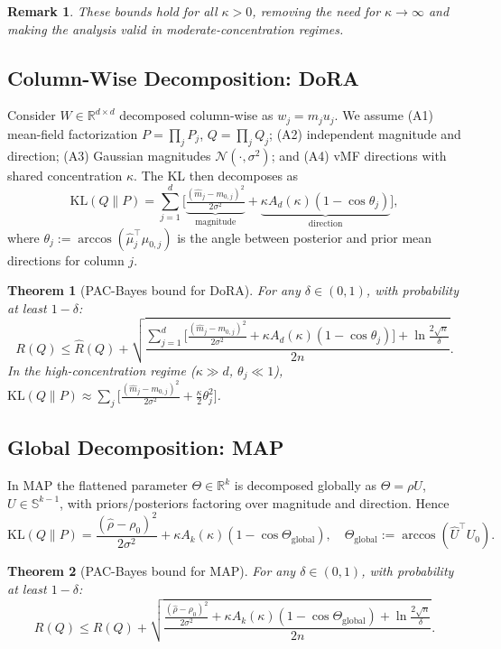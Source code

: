 \documentclass[11pt]{article}
\newtheorem{theorem}{Theorem}
\newtheorem{remark}{Remark}
\newcommand{\KL}{\mathrm{KL}}
\newcommand{\Risk}{R}
\newcommand{\eRisk}{\hat{R}}
\newcommand{\Thetaglob}{\Theta_{\mathrm{global}}}
\newcommand{\R}{\mathbb{R}}
\begin{document}
\begin{remark}
These bounds hold for all $\kappa>0$, removing the need for $\kappa\to\infty$ and
making the analysis valid in moderate-concentration regimes.
\end{remark}

\subsection{Column-Wise Decomposition: DoRA}
Consider $W\in\R^{d\times d}$ decomposed column-wise as $w_j = m_j u_j$. We assume
(A1) mean-field factorization $P=\prod_j P_j$, $Q=\prod_j Q_j$; (A2) independent
magnitude and direction; (A3) Gaussian magnitudes
$\mathcal{N}(\cdot,\sigma^2)$; and (A4) vMF directions with shared concentration
$\kappa$. The KL then decomposes as
\begin{equation}\label{eq:kldecomp}
\KL(Q\|P) = \sum_{j=1}^d \Big[ \underbrace{\tfrac{(\hat m_j-m_{0,j})^2}{2\sigma^2}}_{\text{magnitude}}
+ \underbrace{\kappa A_d(\kappa)(1-\cos\theta_j)}_{\text{direction}} \Big],
\end{equation}
where $\theta_j := \arccos(\hat\mu_j^\top\mu_{0,j})$ is the angle between posterior
and prior mean directions for column $j$.

\begin{theorem}[PAC-Bayes bound for DoRA]\label{thm:dora-bound}
For any $\delta\in(0,1)$, with probability at least $1-\delta$:
\[
\Risk(Q)\le\eRisk(Q)+\sqrt{\frac{\sum_{j=1}^d\!\big[\frac{(\hat m_j-m_{0,j})^2}{2\sigma^2}
+\kappa A_d(\kappa)(1-\cos\theta_j)\big]+\ln\frac{2\sqrt n}{\delta}}{2n}}.
\]
In the high-concentration regime ($\kappa\gg d$, $\theta_j\ll1$),
$\KL(Q\|P)\approx\sum_j\big[\frac{(\hat m_j-m_{0,j})^2}{2\sigma^2}+\frac{\kappa}{2}\theta_j^2\big]$.
\end{theorem}

\subsection{Global Decomposition: MAP}
In MAP the flattened parameter $\Theta\in\R^k$ is decomposed globally as
$\Theta=\rho U$, $U\in\mathbb{S}^{k-1}$, with priors/posteriors factoring over
magnitude and direction. Hence
\begin{equation}
\KL(Q\|P)=\frac{(\hat\rho-\rho_0)^2}{2\sigma^2}+\kappa A_k(\kappa)(1-\cos\Thetaglob),
\quad \Thetaglob:=\arccos(\hat U^\top U_0).
\end{equation}

\begin{theorem}[PAC-Bayes bound for MAP]\label{thm:map-bound}
For any $\delta\in(0,1)$, with probability at least $1-\delta$:
\[
\Risk(Q)\le\eRisk(Q)+\sqrt{\frac{\frac{(\hat\rho-\rho_0)^2}{2\sigma^2}
+\kappa A_k(\kappa)(1-\cos\Thetaglob)+\ln\frac{2\sqrt n}{\delta}}{2n}}.
\]
\end{theorem}
\end{document}

